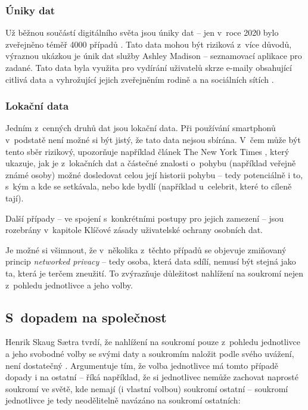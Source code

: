 \subsubsection*{Úniky dat}
Už běžnou součástí digitálního světa jsou úniky dat -- jen v~roce 2020 bylo zveřejněno téměř 4000 případů \citep{data-breaches-2021}. Tato data mohou být riziková z~více důvodů, výraznou ukázkou je únik dat služby Ashley Madison -- seznamovací aplikace pro zadané. Tato data byla využita pro vydírání uživatelů skrze e-maily obsahující citlivá data a vyhrožující jejich zveřejněním rodině a na sociálních sítích \citep{ashley-madison-leak}.

\subsubsection*{Lokační data}
Jedním z~cenných druhů dat jsou lokační data. Při používání smartphonů v~podstatě není možné si být jistý, že tato data nejsou sbírána. V~čem může být tento sběr rizikový, upozorňuje například článek The New York Times \citep{location-data}, který ukazuje, jak je z~lokačních dat a částečné znalosti o~pohybu (například veřejně známé osoby) možné dosledovat celou její historii pohybu -- tedy potenciálně i to, s~kým a kde se setkávala, nebo kde bydlí (například u~celebrit, které to cíleně tají).   

Další případy -- ve spojení s~konkrétními postupy pro jejich zamezení -- jsou rozebrány v~kapitole Klíčové zásady uživatelské ochrany osobních dat.

Je možné si všimnout, že v~několika z~těchto případů se objevuje zmiňovaný princip \textit{networked privacy} -- tedy osoba, která data sdílí, nemusí být stejná jako ta, která je terčem zneužití. To zvýrazňuje důležitost nahlížení na soukromí nejen z~pohledu jednotlivce a jeho volby.

\subsection{S~dopadem na společnost}
Henrik Skaug Sætra tvrdí, že nahlížení na soukromí pouze z~pohledu jednotlivce a jeho svobodné volby se svými daty a soukromím naložit podle svého uvážení, není dostatečný \citep{privacy-as-aggregate-public-good}. Argumentuje tím, že volba jednotlivce má tomto případě dopady i na ostatní -- říká například, že si jednotlivec nemůže zachovat naprosté soukromí ve světě, kde nemají (i vlastní volbou) soukromí ostatní  -- soukromí jednotlivce je tedy neodělitelně navázáno na soukromí ostatních:

